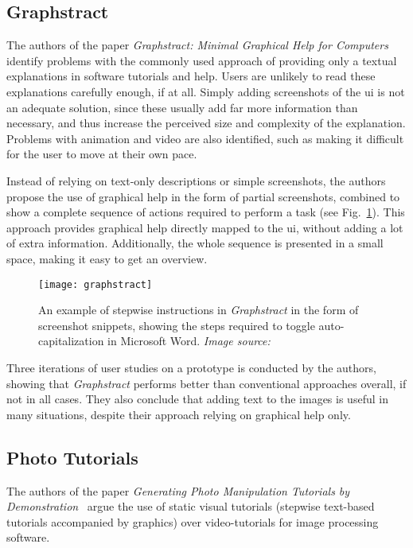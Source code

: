 \subsection{Graphstract}
\label{sec:graphstract}
The authors of the paper \emph{Graphstract: Minimal Graphical Help for Computers}~\cite{huang:graphstract} identify problems with the commonly used approach of providing only a textual explanations in software tutorials and help. Users are unlikely to read these explanations carefully enough, if at all. Simply adding screenshots of the \gls{ui} is not an adequate solution, since these usually add far more information than necessary, and thus increase the perceived size and complexity of the explanation. Problems with animation and video are also identified, such as making it difficult for the user to move at their own pace.

\noindent
Instead of relying on text-only descriptions or simple screenshots, the authors propose the use of graphical help in the form of partial screenshots, combined to show a complete sequence of actions required to perform a task (see Fig.~\ref{fig:graphstract}). This approach provides graphical help directly mapped to the \gls{ui}, without adding a lot of extra information. Additionally, the whole sequence is presented in a small space, making it easy to get an overview.

\begin{figure}[htp]
	\centering
	\texttt{[image: graphstract]}
	\caption[\emph{Graphstract} example]{An example of stepwise instructions in \emph{Graphstract} in the form of screenshot snippets, showing the steps required to toggle auto-capitalization in Microsoft Word. \emph{Image source:~\cite{huang:graphstract}}}
	\label{fig:graphstract}
\end{figure}

\noindent
Three iterations of user studies on a prototype is conducted by the authors, showing that \emph{Graphstract} performs better than conventional approaches overall, if not in all cases. They also conclude that adding text to the images is useful in many situations, despite their approach relying on graphical help only.

\subsection{Photo Tutorials}
\label{sec:photo_tutorials}
The authors of the paper \emph{Generating Photo Manipulation Tutorials by Demonstration}~\cite{grabler:photo_tutorials} argue the use of static visual tutorials (stepwise text-based tutorials accompanied by graphics) over video-tutorials for image processing software.

